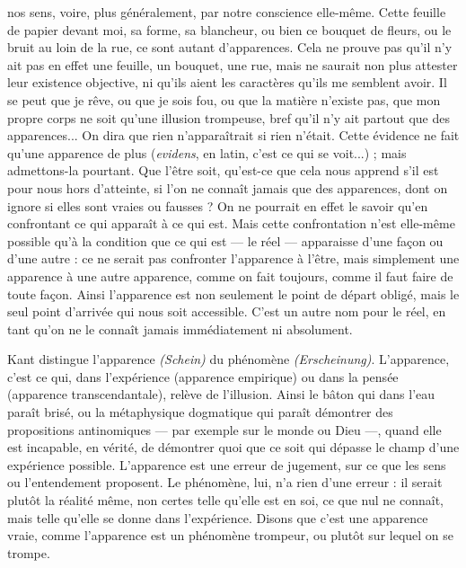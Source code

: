 nos sens, voire, plus généralement, par notre conscience
elle-même. Cette feuille de papier devant moi, sa forme, sa blancheur, ou
bien ce bouquet de fleurs, ou le bruit au loin de la rue, ce sont autant
d’apparences. Cela ne prouve pas qu’il n’y ait pas en effet une feuille, un
bouquet, une rue, mais ne saurait non plus attester leur existence objective,
ni qu'ils aient les caractères qu’ils me semblent avoir. Il se peut que je rêve,
ou que je sois fou, ou que la matière n'existe pas, que mon propre corps ne
soit qu’une illusion trompeuse, bref qu’il n’y ait partout que des apparences...
On dira que rien n’apparaîtrait si rien n’était. Cette évidence ne
fait qu’une apparence de plus ({\it evidens}, en latin, c’est ce qui se voit...) ; mais
admettons-la pourtant. Que l’être soit, qu'est-ce que cela nous apprend s’il
est pour nous hors d’atteinte, si l’on ne connaît jamais que des apparences,
dont on ignore si elles sont vraies ou fausses ? On ne pourrait en effet le
savoir qu’en confrontant ce qui apparaît à ce qui est. Mais cette confrontation
n’est elle-même possible qu’à la condition que ce qui est — le réel —
apparaisse d’une façon ou d’une autre : ce ne serait pas confronter l’apparence
à l’être, mais simplement une apparence à une autre apparence,
comme on fait toujours, comme il faut faire de toute façon. Ainsi l’apparence
est non seulement le point de départ obligé, mais le seul point
d'arrivée qui nous soit accessible. C’est un autre nom pour le réel, en tant
qu'on ne le connaît jamais immédiatement ni absolument.

Kant distingue l'apparence {\it (Schein)} du phénomène {\it (Erscheinung)}. L’apparence,
c'est ce qui, dans l’expérience (apparence empirique) ou dans la pensée
(apparence transcendantale), relève de l'illusion. Ainsi le bâton qui dans l’eau
paraît brisé, ou la métaphysique dogmatique qui paraît démontrer des propositions
antinomiques — par exemple sur le monde ou Dieu —, quand elle est incapable,
en vérité, de démontrer quoi que ce soit qui dépasse le champ d’une
expérience possible. L’apparence est une erreur de jugement, sur ce que les sens
ou l’entendement proposent. Le phénomène, lui, n’a rien d’une erreur : il serait
plutôt la réalité même, non certes telle qu’elle est en soi, ce que nul ne connaît,
mais telle qu’elle se donne dans l’expérience. Disons que c’est une apparence
vraie, comme l’apparence est un phénomène trompeur, ou plutôt sur lequel on
se trompe.

